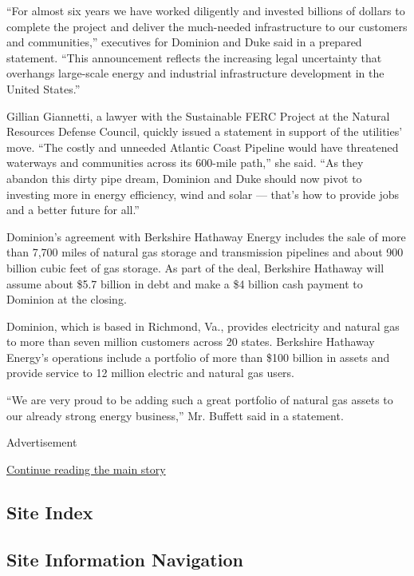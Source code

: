 ``For almost six years we have worked diligently and invested billions
of dollars to complete the project and deliver the much-needed
infrastructure to our customers and communities,'' executives for
Dominion and Duke said in a prepared statement. ``This announcement
reflects the increasing legal uncertainty that overhangs large-scale
energy and industrial infrastructure development in the United States.''

Gillian Giannetti, a lawyer with the Sustainable FERC Project at the
Natural Resources Defense Council, quickly issued a statement in support
of the utilities' move. ``The costly and unneeded Atlantic Coast
Pipeline would have threatened waterways and communities across its
600-mile path,'' she said. ``As they abandon this dirty pipe dream,
Dominion and Duke should now pivot to investing more in energy
efficiency, wind and solar --- that's how to provide jobs and a better
future for all.''

Dominion's agreement with Berkshire Hathaway Energy includes the sale of
more than 7,700 miles of natural gas storage and transmission pipelines
and about 900 billion cubic feet of gas storage. As part of the deal,
Berkshire Hathaway will assume about \$5.7 billion in debt and make a
\$4 billion cash payment to Dominion at the closing.

Dominion, which is based in Richmond, Va., provides electricity and
natural gas to more than seven million customers across 20 states.
Berkshire Hathaway Energy's operations include a portfolio of more than
\$100 billion in assets and provide service to 12 million electric and
natural gas users.

``We are very proud to be adding such a great portfolio of natural gas
assets to our already strong energy business,'' Mr. Buffett said in a
statement.

Advertisement

\protect\hyperlink{after-bottom}{Continue reading the main story}

\hypertarget{site-index}{%
\subsection{Site Index}\label{site-index}}

\hypertarget{site-information-navigation}{%
\subsection{Site Information
Navigation}\label{site-information-navigation}}

